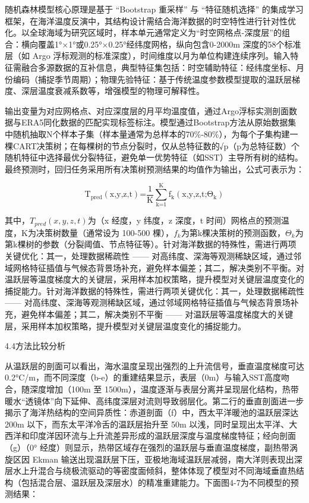 \documentclass[
  12pt,
]{article}
\begin{document}
随机森林模型核心原理是基于 ``Bootstrap 重采样'' 与 ``特征随机选择''
的集成学习框架，在海洋温度反演中，其结构设计需结合海洋数据的时空特性进行针对性优化。以全球海域为研究区域时，样本单元通常定义为``时空网格点-深度层''的组合：横向覆盖1°×1°或0.25°×0.25°经纬度网格，纵向包含0-2000m
深度的58个标准层（如 Argo
浮标观测的标准深度），时间维度以月为单位构建连续序列。输入特征需融合多源数据的互补信息，典型特征集包括：时空辅助特征：经纬度坐标、月份编码（捕捉季节周期）；物理先验特征：基于传统温度参数模型提取的温跃层梯度、深层温度衰减系数等，增强模型的物理可解释性。

输出变量为对应网格点、对应深度层的月平均温度值，通过Argo浮标实测剖面数据与ERA5同化数据的匹配实现标签标注。模型通过Bootstrap方法从原始数据集中随机抽取N个样本子集（样本量通常为总样本的70\%-80\%），为每个子集构建一棵CART决策树；在每棵树的节点分裂时，仅从总特征数的√p（p为总特征数）个随机特征中选择最优分裂特征，避免单一优势特征（如SST）主导所有树的结构。最终预测时，回归任务采用所有决策树预测结果的均值作为输出，公式可表示为：

\[\text{T}_{\text{pred}}\left( \text{x,y,z,t} \right)\text{=}\frac{\text{1}}{\text{K}}\sum_{\text{k=1}}^{\text{K}}{\text{f}_{\text{k}}\left( \text{x,y,z,t;}\text{Θ}_{\text{k}} \right)}\]

其中，\(T_{pred}(x,y,z,t)\)为（x 经度，y 纬度，z 深度，t
时间）网格点的预测温度，K为决策树数量（通常设为 100-500
棵），\(f_{k}\)为第k棵决策树的预测函数，\(\Theta_{k}\)为第k棵树的参数（分裂阈值、节点特征等）。针对海洋数据的特殊性，需进行两项关键优化：其一，处理数据稀疏性
------
对高纬度、深海等观测稀缺区域，通过邻域网格特征插值与气候态背景场补充，避免样本偏差；其二，解决类别不平衡。对温跃层等温度梯度大的关键层，采用样本加权策略，提升模型对关键层温度变化的捕捉能力。针对海洋数据的特殊性，需进行两项关键优化：其一，处理数据稀疏性
------
对高纬度、深海等观测稀缺区域，通过邻域网格特征插值与气候态背景场补充，避免样本偏差；其二，解决类别不平衡
------
对温跃层等温度梯度大的关键层，采用样本加权策略，提升模型对关键层温度变化的捕捉能力。

\protect{}\label{_Toc959700667}{}4.4方法比较分析

从温跃层的剖面可以看出，海水温度呈现出强烈的上升流信号，垂直温度梯度可达0.2°C/m，而不同深度（b-e）的重建结果显示，表层（0m）与输入SST高度吻合，随深度增加（100m
至
1500m），温度逐渐与表层分离并呈现层化结构，热带暖水``透镜体''向下延伸、高纬度深层对流则导致弱层化。第二行的垂直剖面进一步揭示了海洋热结构的空间异质性：赤道剖面（f）中，西太平洋暖池的温跃层深达
200m 以下，而东太平洋冷舌的温跃层抬升至 50m
以浅，同时呈现出太平洋、大西洋和印度洋因环流与上升流差异形成的温跃层深度与温度梯度特征；经向剖面（g）（0°
经度）则显示，热带区域存在强烈的温跃层与垂直温度梯度，副热带涡旋区因
Ekman
输送出现温跃层下压，亚极地海域温跃层减弱，南大洋则表现出深层水上升混合与绕极流驱动的等密度面倾斜，整体体现了模型对不同海域垂直热结构（包括混合层、温跃层及深层水）的精准重建能力。下面图4-7为不同模型的预测结果：
\end{document}
